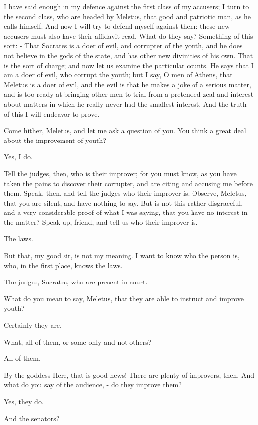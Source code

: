 I have said enough in my defence against the first class of my accusers;
I turn to the second class, who are headed by Meletus, that good and
patriotic man, as he calls himself. And now I will try to defend myself
against them: these new accusers must also have their affidavit read.
What do they say? Something of this sort: - That Socrates is a doer
of evil, and corrupter of the youth, and he does not believe in the
gods of the state, and has other new divinities of his own. That is
the sort of charge; and now let us examine the particular counts.
He says that I am a doer of evil, who corrupt the youth; but I say,
O men of Athens, that Meletus is a doer of evil, and the evil is that
he makes a joke of a serious matter, and is too ready at bringing
other men to trial from a pretended zeal and interest about matters
in which he really never had the smallest interest. And the truth
of this I will endeavor to prove. 

Come hither, Meletus, and let me ask a question of you. You think
a great deal about the improvement of youth? 

Yes, I do. 

Tell the judges, then, who is their improver; for you must know, as
you have taken the pains to discover their corrupter, and are citing
and accusing me before them. Speak, then, and tell the judges who
their improver is. Observe, Meletus, that you are silent, and have
nothing to say. But is not this rather disgraceful, and a very considerable
proof of what I was saying, that you have no interest in the matter?
Speak up, friend, and tell us who their improver is. 

The laws. 

But that, my good sir, is not my meaning. I want to know who the person
is, who, in the first place, knows the laws. 

The judges, Socrates, who are present in court. 

What do you mean to say, Meletus, that they are able to instruct and
improve youth? 

Certainly they are. 

What, all of them, or some only and not others? 

All of them. 

By the goddess Here, that is good news! There are plenty of improvers,
then. And what do you say of the audience, - do they improve them?

Yes, they do. 

And the senators? 


